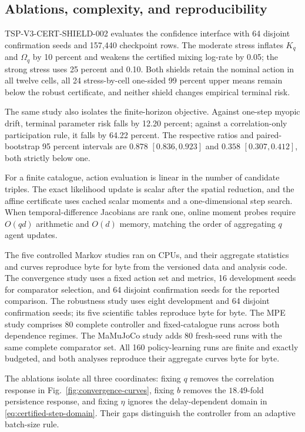\documentclass[journal]{IEEEtran}
\begin{document}
\subsection{Ablations, complexity, and reproducibility}
TSP-V3-CERT-SHIELD-002 evaluates the confidence interface with 64 disjoint confirmation seeds and 157,440 checkpoint rows.
The moderate stress inflates $K_q$ and $\Omega_q$ by 10 percent and weakens the certified mixing log-rate by 0.05; the strong stress uses 25 percent and 0.10.
Both shields retain the nominal action in all twelve cells, all 24 stress-by-cell one-sided 99 percent upper means remain below the robust certificate, and neither shield changes empirical terminal risk.

The same study also isolates the finite-horizon objective.
Against one-step myopic drift, terminal parameter risk falls by 12.20 percent; against a correlation-only participation rule, it falls by 64.22 percent.
The respective ratios and paired-bootstrap 95 percent intervals are $0.878$ $[0.836,0.923]$ and $0.358$ $[0.307,0.412]$, both strictly below one.

For a finite catalogue, action evaluation is linear in the number of candidate triples.
The exact likelihood update is scalar after the spatial reduction, and the affine certificate uses cached scalar moments and a one-dimensional step search.
When temporal-difference Jacobians are rank one, online moment probes require $O(qd)$ arithmetic and $O(d)$ memory, matching the order of aggregating $q$ agent updates.

The five controlled Markov studies ran on CPUs, and their aggregate statistics and curves reproduce byte for byte from the versioned data and analysis code.
The convergence study uses a fixed action set and metrics, 16 development seeds for comparator selection, and 64 disjoint confirmation seeds for the reported comparison.
The robustness study uses eight development and 64 disjoint confirmation seeds; its five scientific tables reproduce byte for byte.
The MPE study comprises 80 complete controller and fixed-catalogue runs across both dependence regimes.
The MaMuJoCo study adds 80 fresh-seed runs with the same complete comparator set.
All 160 policy-learning runs are finite and exactly budgeted, and both analyses reproduce their aggregate curves byte for byte.

The ablations isolate all three coordinates: fixing $q$ removes the correlation response in Fig.~\ref{fig:convergence-curves}, fixing $b$ removes the $18.49$-fold persistence response, and fixing $\eta$ ignores the delay-dependent domain in \eqref{eq:certified-step-domain}.
Their gaps distinguish the controller from an adaptive batch-size rule.
\end{document}
